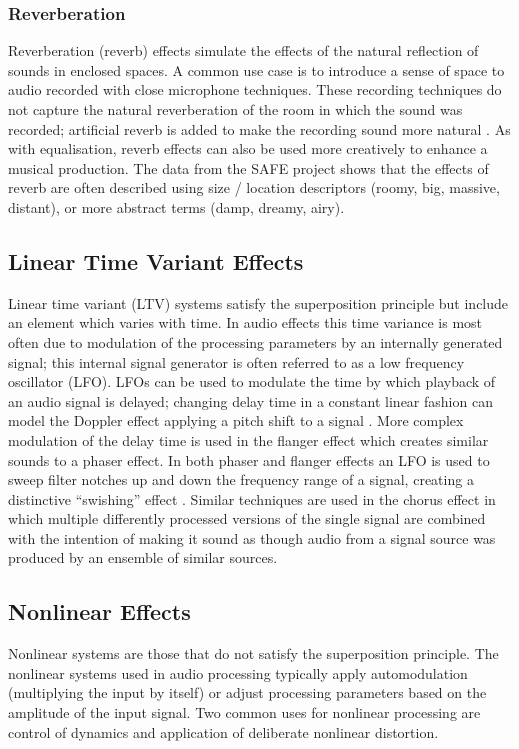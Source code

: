 		\subsubsection*{Reverberation}
			Reverberation (reverb) effects simulate the effects of the natural reflection of sounds in enclosed
			spaces. A common use case is to introduce a sense of space to audio recorded with close microphone
			techniques. These recording techniques do not capture the natural reverberation of the room in
			which the sound was recorded; artificial reverb is added to make the recording sound more natural
			\citep{gottlieb2007shaping}. As with equalisation, reverb effects can also be used more creatively
			to enhance a musical production. The data from the SAFE project shows that the effects of
			reverb are often described using size / location descriptors (roomy, big, massive, distant), or
			more abstract terms (damp, dreamy, airy).

	\subsection{Linear Time Variant Effects}
	\label{sec:Timbre-AudioProcessing-LTV}
		Linear time variant (LTV) systems satisfy the superposition principle but include an element which varies
		with time. In audio effects this time variance is most often due to modulation of the processing parameters
		by an internally generated signal; this internal signal generator is often referred to as a low frequency
		oscillator (LFO). LFOs can be used to modulate the time by which playback of an audio signal is delayed;
		changing delay time in a constant linear fashion can model the Doppler effect applying a pitch shift to a
		signal \citep{dattorro1997effect}. More complex modulation of the delay time is used in the flanger effect
		which creates similar sounds to a phaser effect. In both phaser and flanger effects an LFO is used to sweep
		filter notches up and down the frequency range of a signal, creating a distinctive ``swishing'' effect
		\citep{huber2010modern}. Similar techniques are used in the chorus effect in which multiple differently
		processed versions of the single signal are combined with the intention of making it sound as though audio
		from a signal source was produced by an ensemble of similar sources.

	\subsection{Nonlinear Effects}
	\label{sec:Timbre-AudioProcessing-Nonlinear}
		Nonlinear systems are those that do not satisfy the superposition principle. The nonlinear systems used in
		audio processing typically apply automodulation (multiplying the input by itself) or adjust processing
		parameters based on the amplitude of the input signal. Two common uses for nonlinear processing are control
		of dynamics and application of deliberate nonlinear distortion.

